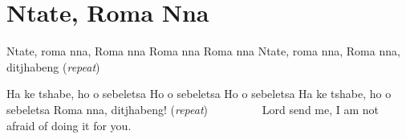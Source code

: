 \starttocol
\chapter{Ntate, Roma Nna}
\nexttocol
\hfill{\it }
\stoptocol
\starttocol
\startlines
N{\sc tate}, roma nna,
Roma nna
Roma nna
Roma nna
Ntate, roma nna, 
Roma nna, ditjhabeng
          \hfill({\it repeat})~~~~~~~~~

Ha ke tshabe, ho o sebeletsa
Ho o sebeletsa
Ho o sebeletsa
Ha ke tshabe, ho o sebeletsa
Roma nna, ditjhabeng!
          \hfill({\it repeat})~~~~~~~~~
\stoplines
\nexttocol
Lord send me, I am not afraid of doing it for you.
\stoptocol
